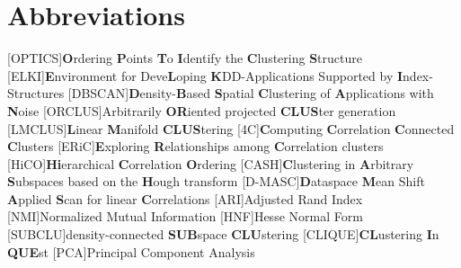 \chapter*{Abbreviations}
\begin{acronym}
    [OPTICS]{\textbf{O}rdering \textbf{P}oints \textbf{T}o \textbf{I}dentify the \textbf{C}lustering \textbf{S}tructure}
    [ELKI]{\textbf{E}nvironment for Deve\textbf{L}oping \textbf{K}DD-Applications Supported by \textbf{I}ndex-Structures}
    [DBSCAN]{\textbf{D}ensity-\textbf{B}ased \textbf{S}patial \textbf{C}lustering of \textbf{A}pplications with \textbf{N}oise}
    [ORCLUS]{Arbitrarily \textbf{OR}iented projected \textbf{CLUS}ter generation}
    [LMCLUS]{\textbf{L}inear \textbf{M}anifold \textbf{CLUS}tering}
    [4C]{\textbf{C}omputing \textbf{C}orrelation \textbf{C}onnected \textbf{C}lusters}
    [ERiC]{\textbf{E}xploring \textbf{R}elationships among \textbf{C}orrelation clusters}
    [HiCO]{\textbf{Hi}erarchical \textbf{C}orrelation \textbf{O}rdering}
    [CASH]{\textbf{C}lustering in \textbf{A}rbitrary \textbf{S}ubspaces based on the \textbf{H}ough transform}
    [D-MASC]{\textbf{D}ataspace \textbf{M}ean Shift \textbf{A}pplied \textbf{S}can for linear \textbf{C}orrelations}
    [ARI]{Adjusted Rand Index}
    [NMI]{Normalized Mutual Information}
    [HNF]{Hesse Normal Form}
    [SUBCLU]{density-connected \textbf{SUB}space \textbf{CLU}stering}
    [CLIQUE]{\textbf{CL}ustering \textbf{I}n \textbf{QUE}st}
    [PCA]{Principal Component Analysis}
\end{acronym}